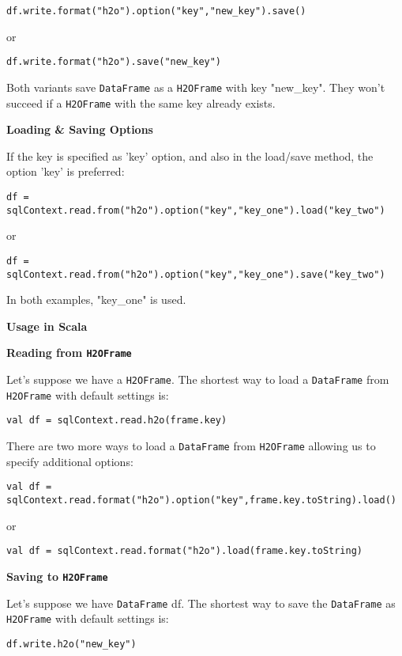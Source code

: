 \begin{lstlisting}[style=Scala]
df.write.format("h2o").option("key","new_key").save()
\end{lstlisting}
or
\begin{lstlisting}[style=Scala]
df.write.format("h2o").save("new_key")
\end{lstlisting}

Both variants save \texttt{DataFrame} as a \texttt{H2OFrame} with key "new\_key". They won't succeed if a \texttt{H2OFrame} with the same key already exists.

\textbf{Loading \& Saving Options}

If the key is specified as 'key' option, and also in the load/save method, the option 'key' is preferred:
\begin{lstlisting}[style=Scala]
df = sqlContext.read.from("h2o").option("key","key_one").load("key_two")
\end{lstlisting}
or
\begin{lstlisting}[style=Scala]
df = sqlContext.read.from("h2o").option("key","key_one").save("key_two")
\end{lstlisting}

In both examples, "key\_one" is used.

\textbf{Usage in Scala}

\textbf{Reading from \texttt{H2OFrame}}

Let's suppose we have a \texttt{H2OFrame}. The shortest way to load a \texttt{DataFrame} from \texttt{H2OFrame} with default settings is:
\begin{lstlisting}[style=Scala]
val df = sqlContext.read.h2o(frame.key)
\end{lstlisting}

There are two more ways to load a \texttt{DataFrame} from \texttt{H2OFrame} allowing us to specify additional options:
\begin{lstlisting}[style=Scala]
val df = sqlContext.read.format("h2o").option("key",frame.key.toString).load()
\end{lstlisting}
or
\begin{lstlisting}[style=Scala]
val df = sqlContext.read.format("h2o").load(frame.key.toString)
\end{lstlisting}

\textbf{Saving to \texttt{H2OFrame}}

Let's suppose we have \texttt{DataFrame} df. The shortest way to save the \texttt{DataFrame} as \texttt{H2OFrame} with default settings is:
\begin{lstlisting}[style=Scala]
df.write.h2o("new_key")
\end{lstlisting}

